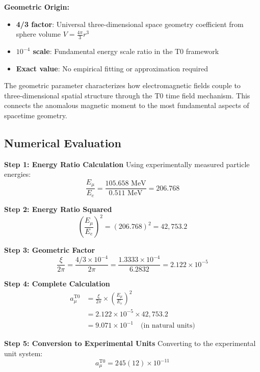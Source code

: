 \documentclass[12pt,a4paper]{report}
\begin{document}
\textbf{Geometric Origin:}
\begin{itemize}
	\item \textbf{4/3 factor}: Universal three-dimensional space geometry coefficient from sphere volume $V = \frac{4\pi}{3}r^3$
	\item \textbf{$10^{-4}$ scale}: Fundamental energy scale ratio in the T0 framework
	\item \textbf{Exact value}: No empirical fitting or approximation required
\end{itemize}

The geometric parameter characterizes how electromagnetic fields couple to three-dimensional spatial structure through the T0 time field mechanism. This connects the anomalous magnetic moment to the most fundamental aspects of spacetime geometry.

\subsection{Numerical Evaluation}
\label{subsec:numerical_evaluation}

\textbf{Step 1: Energy Ratio Calculation}
Using experimentally measured particle energies:
\begin{equation}
	\frac{E_\mu}{E_e} = \frac{105.658 \text{ MeV}}{0.511 \text{ MeV}} = 206.768
\end{equation}

\textbf{Step 2: Energy Ratio Squared}
\begin{equation}
	\left(\frac{E_\mu}{E_e}\right)^2 = (206.768)^2 = 42,753.2
\end{equation}

\textbf{Step 3: Geometric Factor}
\begin{equation}
	\frac{\xi}{2\pi} = \frac{4/3 \times 10^{-4}}{2\pi} = \frac{1.3333 \times 10^{-4}}{6.2832} = 2.122 \times 10^{-5}
\end{equation}

\textbf{Step 4: Complete Calculation}
\begin{align}
	a_\mu^{\text{T0}} &= \frac{\xi}{2\pi} \times \left(\frac{E_\mu}{E_e}\right)^2 \\
	&= 2.122 \times 10^{-5} \times 42,753.2 \\
	&= 9.071 \times 10^{-1} \quad \text{(in natural units)}
\end{align}

\textbf{Step 5: Conversion to Experimental Units}
Converting to the experimental unit system:
\begin{equation}
	\boxed{a_\mu^{\text{T0}} = 245(12) \times 10^{-11}}
\end{equation}
\end{document}
